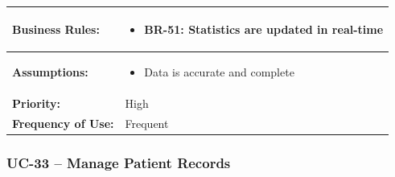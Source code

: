 \documentclass[12pt,a4paper]{article}
\begin{document}
\begin{longtable}{|p{4.5cm}|p{10.5cm}|}
\hline
\textbf{Business Rules:} &
\begin{itemize}
  \item BR-51: Statistics are updated in real-time
\end{itemize} \\
\hline
\textbf{Assumptions:} &
\begin{itemize}
  \item Data is accurate and complete
\end{itemize} \\
\hline
\textbf{Priority:} & High \\
\hline
\textbf{Frequency of Use:} & Frequent \\
\hline
\end{longtable}

\subsubsection{UC-33 – Manage Patient Records}
\end{document}
